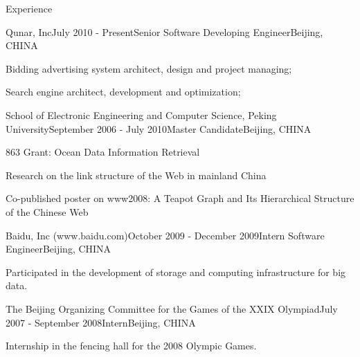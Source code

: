 \documentclass{resume} %
\begin{document}
\begin{rSection}{Experience}

\begin{rSubsection}{Qunar, Inc}{July 2010 - Present}{Senior Software Developing Engineer}{Beijing, CHINA}
\item Bidding advertising system architect, design and project managing;
\item Search engine architect, development and optimization;
\end{rSubsection}


\begin{rSubsection}{School of Electronic Engineering and Computer
    Science, Peking University}{September 2006 - July 2010}{Master Candidate}{Beijing, CHINA}
\item 863 Grant: Ocean Data Information Retrieval
\item Research on the link structure of the Web in mainland China
\item Co-published poster on www2008: A
Teapot Graph and Its Hierarchical Structure of the Chinese Web
\end{rSubsection}


\begin{rSubsection}{Baidu, Inc (www.baidu.com)}{October 2009 - December 2009}{Intern Software Engineer}{Beijing, CHINA}
\item Participated in the development of storage and computing
  infrastructure for big data.
\end{rSubsection}

\begin{rSubsection}{The Beijing Organizing Committee for the Games of
    the XXIX Olympiad}{July 2007 - September 2008}{Intern}{Beijing, CHINA}
\item Internship in the fencing hall for the 2008 Olympic Games.
\end{rSubsection}

\end{rSection}
\end{document}

